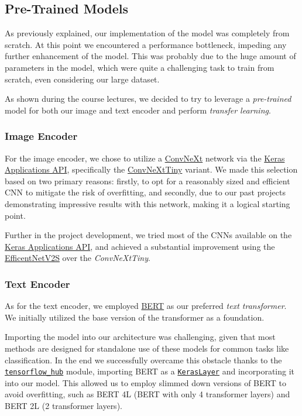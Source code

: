 \documentclass[10pt,twocolumn,letterpaper]{article}
\begin{document}
\subsection{Pre-Trained Models}
As previously explained, our implementation of the model was completely from scratch. At this point we encountered a performance bottleneck, impeding any further enhancement of the model. This was probably due to the huge amount of parameters in the model, which were quite a challenging task to train from scratch, even considering our large dataset.

As shown during the course lectures, we decided to try to leverage a \textit{pre-trained} model for both our image and text encoder and perform \textit{transfer learning}.

\subsubsection{Image Encoder}
For the image encoder, we chose to utilize a \href{https://github.com/facebookresearch/ConvNeXt}{ConvNeXt} network via the \href{https://keras.io/api/applications/}{Keras Applications API}, specifically the \href{https://keras.io/api/applications/convnext/#convnexttiny-function}{ConvNeXtTiny} variant. %
We made this selection based on two primary reasons: firstly, to opt for a reasonably sized and efficient CNN to mitigate the risk of overfitting, and secondly, due to our past projects demonstrating impressive results with this network, making it a logical starting point.

Further in the project development, we tried most of the CNNs available on the \href{https://keras.io/api/applications/}{Keras Applications API}, and achieved a substantial improvement using the \href{https://keras.io/api/applications/efficientnet_v2/#efficientnetv2s-function}{EfficentNetV2S} over the \textit{ConvNeXtTiny}.

\subsubsection{Text Encoder}
As for the text encoder, we employed \href{https://huggingface.co/docs/transformers/model_doc/bert}{BERT} as our preferred \textit{text transformer}.
We initially utilized the base version of the transformer as a foundation.

Importing the model into our architecture was challenging, given that most methods are designed for standalone use of these models for common tasks like classification.
In the end we successfully overcame this obstacle thanks to the \href{https://www.tensorflow.org/hub}{\texttt{tensorflow\_hub}} module, importing BERT as a \href{https://www.tensorflow.org/hub/api_docs/python/hub/KerasLayer}{\texttt{KerasLayer}} and incorporating it into our model. This allowed us to employ slimmed down versions of BERT to avoid overfitting, such as BERT 4L (BERT with only 4 transformer layers) and BERT 2L (2 transformer layers).
\end{document}
